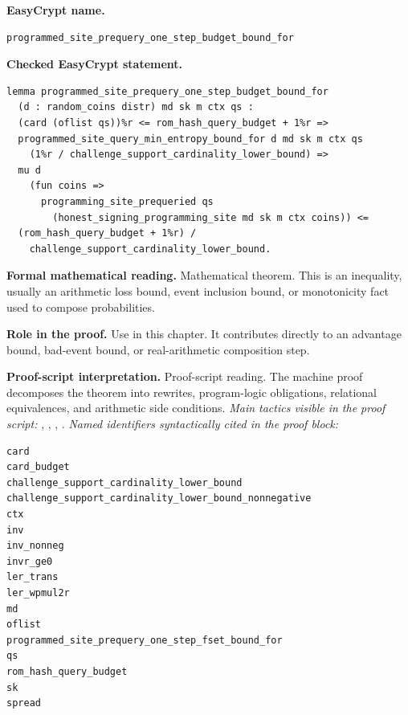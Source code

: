 \begin{formaltheorem}
\noindent\textbf{EasyCrypt name.}
\begin{lstlisting}[language=EasyCrypt,basicstyle=\ttfamily\scriptsize]
programmed_site_prequery_one_step_budget_bound_for
\end{lstlisting}
\noindent\textbf{Checked EasyCrypt statement.}
\begin{lstlisting}[language=EasyCrypt,basicstyle=\ttfamily\scriptsize]
lemma programmed_site_prequery_one_step_budget_bound_for
  (d : random_coins distr) md sk m ctx qs :
  (card (oflist qs))%r <= rom_hash_query_budget + 1%r =>
  programmed_site_query_min_entropy_bound_for d md sk m ctx qs
    (1%r / challenge_support_cardinality_lower_bound) =>
  mu d
    (fun coins =>
      programming_site_prequeried qs
        (honest_signing_programming_site md sk m ctx coins)) <=
  (rom_hash_query_budget + 1%r) /
    challenge_support_cardinality_lower_bound.
\end{lstlisting}
\noindent\textbf{Formal mathematical reading.}
Mathematical theorem. This is an inequality, usually an arithmetic loss bound, event inclusion bound, or monotonicity fact used to compose probabilities.

\noindent\textbf{Role in the proof.}
Use in this chapter. It contributes directly to an advantage bound, bad-event bound, or real-arithmetic composition step.

\noindent\textbf{Proof-script interpretation.}
Proof-script reading. The machine proof decomposes the theorem into rewrites, program-logic obligations, relational equivalences, and arithmetic side conditions.
\emph{Main tactics visible in the proof script:} , , , .
\emph{Named identifiers syntactically cited in the proof block:}
\begin{lstlisting}[language=EasyCrypt,basicstyle=\ttfamily\scriptsize]
card
card_budget
challenge_support_cardinality_lower_bound
challenge_support_cardinality_lower_bound_nonnegative
ctx
inv
inv_nonneg
invr_ge0
ler_trans
ler_wpmul2r
md
oflist
programmed_site_prequery_one_step_fset_bound_for
qs
rom_hash_query_budget
sk
spread
\end{lstlisting}

\end{formaltheorem}


